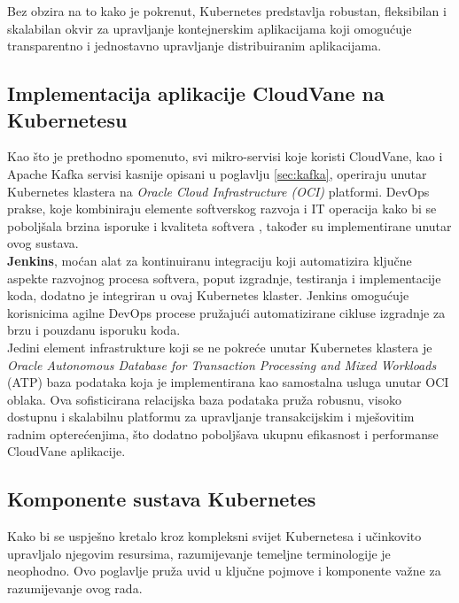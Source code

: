 \documentclass[times, utf8, diplomski]{fer}
\begin{document}
Bez obzira na to kako je pokrenut, Kubernetes predstavlja robustan, fleksibilan i skalabilan okvir za upravljanje kontejnerskim aplikacijama koji omogućuje transparentno i jednostavno upravljanje distribuiranim aplikacijama.

\subsection{Implementacija aplikacije CloudVane na Kubernetesu}

Kao što je prethodno spomenuto, svi mikro-servisi koje koristi CloudVane, kao i Apache Kafka servisi kasnije opisani u poglavlju \ref{sec:kafka}, operiraju unutar Kubernetes klastera na \emph{Oracle Cloud Infrastructure (OCI)} platformi. DevOps prakse, koje kombiniraju elemente softverskog razvoja  i IT operacija  kako bi se poboljšala brzina isporuke i kvaliteta softvera \citep{courtemanche_what_2021}, također su implementirane unutar ovog sustava.\\

\textbf{Jenkins}, moćan alat za kontinuiranu integraciju koji automatizira ključne aspekte razvojnog procesa softvera, poput izgradnje, testiranja i implementacije koda, dodatno je integriran u ovaj Kubernetes klaster. Jenkins omogućuje korisnicima agilne DevOps procese pružajući automatizirane cikluse izgradnje za brzu i pouzdanu isporuku koda.\\

Jedini element infrastrukture koji se ne pokreće unutar Kubernetes klastera je \emph{Oracle Autonomous Database for Transaction Processing and Mixed Workloads} (ATP) baza podataka koja je implementirana kao samostalna usluga unutar OCI oblaka. Ova sofisticirana relacijska baza podataka pruža robusnu, visoko dostupnu i skalabilnu platformu za upravljanje transakcijskim i mješovitim radnim opterećenjima, što dodatno poboljšava ukupnu efikasnost i performanse CloudVane aplikacije.\\

\subsection{Komponente sustava Kubernetes}
\label{sec:k8sComponents}

Kako bi se uspješno kretalo kroz kompleksni svijet Kubernetesa i učinkovito upravljalo njegovim resursima, razumijevanje temeljne terminologije je neophodno. Ovo poglavlje pruža uvid u ključne pojmove i komponente važne za razumijevanje ovog rada.
\end{document}
